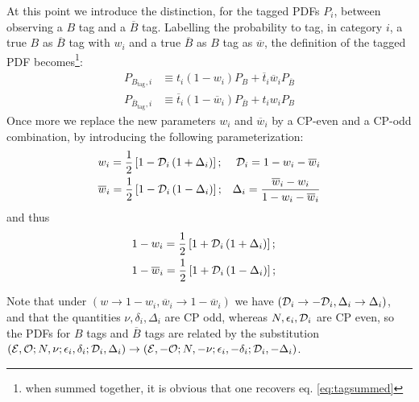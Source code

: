 \documentclass[a4paper,9pt,twosided]{article}
\begin{document}
At this point we introduce the distinction, for the tagged PDFs $P_i$, between observing a $B$ tag and a $\overline{B}$ tag.
Labelling the probability to tag, in category $i$, a true $B$ as $\overline{B}$ tag with $w_i$ and a true $\overline{B}$ as $B$ tag as $\overline{w}$,
the definition of the tagged PDF becomes\footnote{when summed together, it is obvious that one recovers eq. \ref{eq:tagsummed}}:
\begin{eqnarray}
   P_{B_\mathrm{tag},i} &\equiv t_i (1-w_i) P_{B} + \overline{t}_i\overline{w}_i P_{\overline{ B} }\\
   P_{\overline{B}_\mathrm{tag},i} &\equiv \overline{t}_i (1-\overline{w}_i) P_{\overline{B}} + t_i w_i P_{ B }
\label{eq:tagdef}
\end{eqnarray} 
Once more we replace the new parameters $w_i$ and $\overline{w}_i$ by a CP-even and a CP-odd combination, by introducing
the following parameterization:
\begin{eqnarray}
&w_i            = \frac{1}{2}\left[1-{\cal D}_i\left(1+{\Delta}_i\right) \right]; &  {\cal D}_i =1-w_i - \overline{w}_i \\
&\overline{w}_i = \frac{1}{2}\left[1-{\cal D}_i\left(1-{\Delta}_i\right) \right]; &  {\Delta}_i =  \frac{\overline{w}_i - w_i }{1-w_i-\overline{w}_i}\\
\end{eqnarray}
and thus
\begin{eqnarray}
   &1-w_i            = \frac{1}{2}\left[1+{\cal D}_i\left(1+{\Delta}_i\right) \right]; &
\\ &1-\overline{w}_i = \frac{1}{2}\left[1+{\cal D}_i\left(1-{\Delta}_i\right) \right]; &
\end{eqnarray}

Note that under $(w\rightarrow 1-w_i, \overline{w}_i\rightarrow 1-\overline{w}_i)$ we have $({\cal D}_i \rightarrow -{\cal D}_i,{\Delta}_i\rightarrow{\Delta}_i)$,
and that the quantities $\nu,\delta_i,{\Delta}_i$ are CP odd, whereas $N,\epsilon_i,{\cal D}_i$ are CP even, so the PDFs
for $B$ tags and $\overline{B}$ tags are related by the substitution $({\cal E},{\cal O};N,\nu;\epsilon_i,\delta_i;{\cal D}_i,\Delta_i )\rightarrow({\cal E},-{\cal O};N,-\nu;\epsilon_i,-\delta_i;{\cal D}_i,-\Delta_i )$.
\end{document}
